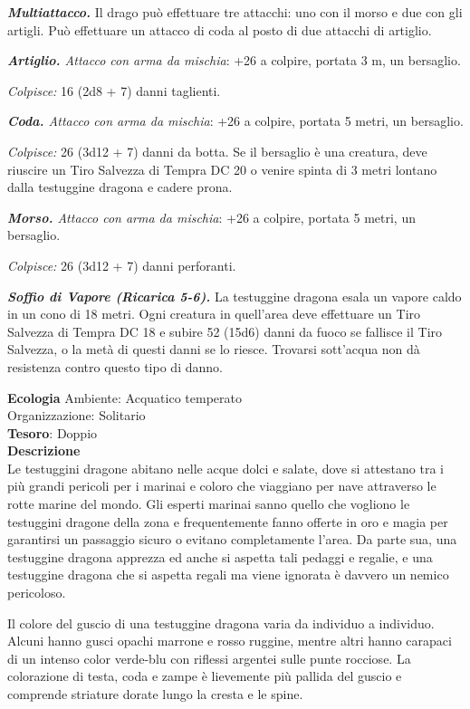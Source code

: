 \begin{multicols}{2}
	\textit{\textbf{Multiattacco.}} Il drago può effettuare tre attacchi: uno con il morso e due con gli artigli. Può effettuare un attacco di coda al posto di due attacchi di artiglio.

	\textit{\textbf{Artiglio.} Attacco con arma da mischia}: +26 a colpire, portata 3 m, un bersaglio.

	\textit{Colpisce:} 16 (2d8 + 7) danni taglienti.

	\textit{\textbf{Coda.} Attacco con arma da mischia}: +26 a colpire, portata 5 metri, un bersaglio.

	\textit{Colpisce:} 26 (3d12 + 7) danni da botta. Se il bersaglio è una creatura, deve riuscire un Tiro Salvezza di Tempra DC 20 o venire spinta di 3 metri lontano dalla testuggine dragona e cadere prona.

	\textit{\textbf{Morso.} Attacco con arma da mischia}: +26 a colpire, portata 5 metri, un bersaglio.

	\textit{Colpisce:} 26 (3d12 + 7) danni perforanti.

	\textit{\textbf{Soffio di Vapore (Ricarica 5-6).}} La testuggine dragona esala un vapore caldo in un cono di 18 metri. Ogni creatura in quell'area deve effettuare un Tiro Salvezza di Tempra DC 18 e subire 52 (15d6) danni da fuoco se fallisce il Tiro Salvezza, o la metà di questi danni se lo riesce. Trovarsi sott'acqua non dà resistenza contro questo tipo di danno.

	\textbf{Ecologia}
	Ambiente: Acquatico temperato\\
	Organizzazione: Solitario\\
	\textbf{Tesoro}: Doppio\\
	\textbf{Descrizione}\\
	Le testuggini dragone abitano nelle acque dolci e salate, dove si attestano tra i più grandi pericoli per i marinai e coloro che viaggiano per nave attraverso le rotte marine del mondo. Gli esperti marinai sanno quello che vogliono le testuggini dragone della zona e frequentemente fanno offerte in oro e magia per garantirsi un passaggio sicuro o evitano completamente l'area. Da parte sua, una testuggine dragona apprezza ed anche si aspetta tali pedaggi e regalie, e una testuggine dragona che si aspetta regali ma viene ignorata è davvero un nemico pericoloso.

	Il colore del guscio di una testuggine dragona varia da individuo a individuo. Alcuni hanno gusci opachi marrone e rosso ruggine, mentre altri hanno carapaci di un intenso color verde-blu con riflessi argentei sulle punte rocciose. La colorazione di testa, coda e zampe è lievemente più pallida del guscio e comprende striature dorate lungo la cresta e le spine.


\end{multicols}

